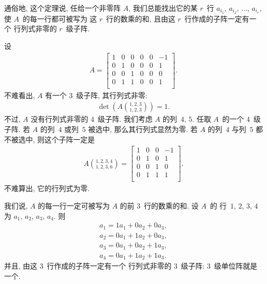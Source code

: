 通俗地, 这个定理说,
任给一个非零阵 \(A\),
我们总能找出它的某 \(r\)~行
\(a_{i_1}\), \(a_{i_2}\), \(\dots\), \(a_{i_r}\),
使 \(A\)~的每一行都可被写为%
这 \(r\)~行的数乘的和,
且由这 \(r\)~行作成的子阵一定有一个%
行列式非零的 \(r\)~级子阵.

\begin{example}
    设
    \begin{align*}
        A =
        \begin{bmatrix}
            1 & 0 & 0 & 0 & 0 & -1 \\
            0 & 1 & 0 & 0 & 0 & 1  \\
            0 & 0 & 1 & 0 & 0 & 0  \\
            0 & 1 & 1 & 0 & 0 & 1  \\
        \end{bmatrix}.
    \end{align*}
    不难看出, \(A\) 有一个 \(3\)~级子阵, 其行列式非零:
    \begin{align*}
        \det {\left(
            A\binom{1,2,3}{1,2,3}
            \right)} = 1.
    \end{align*}
    不过, \(A\) 没有行列式非零的 \(4\)~级子阵.
    我们考虑 \(A\) 的列~\(4\), \(5\).
    任取 \(A\)~的一个 \(4\)~级子阵.
    若 \(A\) 的列~\(4\) 或列~\(5\) 被选中,
    那么其行列式显然为零.
    若 \(A\) 的列~\(4\) 与列~\(5\) 都不被选中,
    则这个子阵一定是
    \begin{align*}
        A\binom{1,2,3,4}{1,2,3,6}
        = \begin{bmatrix}
              1 & 0 & 0 & -1 \\
              0 & 1 & 0 & 1  \\
              0 & 0 & 1 & 0  \\
              0 & 1 & 1 & 1  \\
          \end{bmatrix}.
    \end{align*}
    不难算出, 它的行列式为零.

    我们说, \(A\) 的每一行一定可被写为
    \(A\) 的前 \(3\)~行的数乘的和.
    设 \(A\)~的%
    行~\(1\), \(2\), \(3\), \(4\)
    为 \(a_1\), \(a_2\), \(a_3\), \(a_4\).
    则
    \begin{align*}
        a_1 = 1a_1 + 0a_2 + 0a_3, \\
        a_2 = 0a_1 + 1a_2 + 0a_3, \\
        a_3 = 0a_1 + 0a_2 + 1a_3, \\
        a_4 = 0a_1 + 1a_2 + 1a_3.
    \end{align*}
    并且, 由这 \(3\)~行作成的子阵一定有一个%
    行列式非零的 \(3\)~级子阵:
    \(3\)~级单位阵就是一个.


\end{example}
